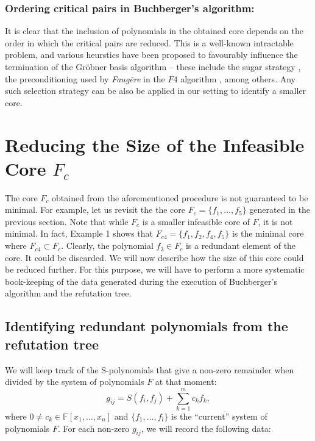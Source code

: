 \subsubsection{Ordering critical pairs in Buchberger's algorithm:} It
is clear that the inclusion of polynomials in the obtained core
depends on the order in which the critical pairs are
reduced. This is a well-known intractable problem, and various
heurstics have been proposed to favourably influence the termination
of the Gr\"obner basis algorithm -- these include the sugar
strategy \cite{GBSelectionStrategies}, the preconditioning used by
{\it Faug\~{e}re} in the $F4$ algorithm \cite{f4}, among others. Any
such selection strategy can be also be applied in our setting to
identify a smaller core. 

\section{Reducing the Size of the Infeasible Core $F_c$}

The core $F_c$ obtained from the aforementioned procedure is not
guaranteed to be minimal. For example, let us revisit the the core
$F_c=\{f_1,\dots, f_5\}$ generated in the previous section. Note that
while $F_c$ is a smaller infeasible core of $F$, it is not minimal. In
fact, Example 1 shows that $F_{c4} =\{f_1,f_2,f_4,f_5\}$ is the
minimal core where $F_{c4} \subset F_{c}$. Clearly, the polynomial
$f_3 \in F_c$ is a redundant element of the core. It could be
discarded. We will now describe how the size of this core could be
reduced further.  For this purpose, we will have to perform a more
systematic book-keeping of the data generated during the execution of
Buchberger's algorithm and the refutation tree. 

\subsection{Identifying redundant polynomials from the refutation tree}

We will keep track of the S-polynomials that give a non-zero remainder
when divided by the system of polynomials $F$ at that moment:
\begin{equation}
\label{eqn1}
g_{ij}= S(f_i,f_j)+\displaystyle\sum_{k=1}^m c_kf_k,
\end{equation}
where $0\neq c_k\in\mathbb{F}[x_1,\ldots,x_n]$ and
$\{f_1,\ldots,f_l\}$ is the ``current'' system of polynomials
$F$. For each non-zero $g_{ij}$, we will record the following data: 

